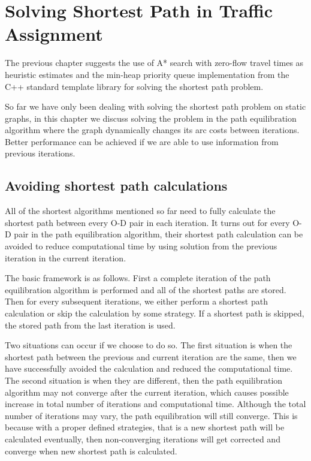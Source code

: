 \chapter{Solving Shortest Path in Traffic Assignment}
The previous chapter suggests the use of A* search with zero-flow travel times as heuristic estimates and the min-heap priority queue implementation from the C++ standard template library for solving the shortest path problem.

So far we have only been dealing with solving the shortest path problem on static graphs,
in this chapter we discuss solving the problem in the path equilibration algorithm where
the graph dynamically changes its arc costs between iterations.
Better performance can be achieved if we are able to use information from previous iterations.


\section{Avoiding shortest path calculations} \label{section:avoid}
All of the shortest algorithms mentioned so far need to fully calculate the shortest path between every O-D pair in each iteration.
It turns out for every O-D pair in the path equilibration algorithm,
their shortest path calculation can be avoided to reduce computational time by using solution from the previous iteration in the current iteration.

The basic framework is as follows.
First a complete iteration of the path equilibration algorithm is performed and all of the shortest paths are stored.
Then for every subsequent iterations,
we either perform a shortest path calculation or skip the calculation by some strategy.
If a shortest path is skipped, the stored path from the last iteration is used.

Two situations can occur if we choose to do so.
The first situation is when the shortest path between the previous and current iteration are the same,
then we have successfully avoided the calculation and reduced the computational time.
The second situation is when they are different,
then the path equilibration algorithm may not converge after the current iteration,
which causes possible increase in total number of iterations and computational time.
Although the total number of iterations may vary,
the path equilibration will still converge.
This is because with a proper defined strategies, that is a new shortest path will be calculated eventually, then non-converging iterations will get corrected and converge when new shortest path is calculated.

